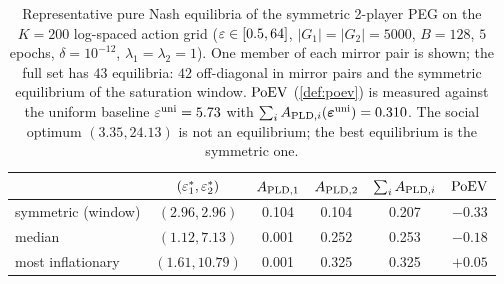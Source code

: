\begin{table}[t]
\centering
\caption{Representative pure Nash equilibria of the symmetric 2-player
PEG on the $K=200$ log-spaced action grid ($\varepsilon \in [0.5, 64]$,
$|G_1|=|G_2|=5000$, $B=128$, $5$ epochs, $\delta=10^{-12}$,
$\lambda_1=\lambda_2=1$). One member of each mirror pair is shown; the
full set has $43$ equilibria: $42$ off-diagonal in mirror pairs and
the symmetric equilibrium of the saturation window. $\mathrm{PoEV}$
(\cref{def:poev}) is measured against the uniform baseline
$\varepsilon^{\mathrm{uni}} = 5.73$ with $\sum_i
A_{\mathrm{PLD},i}(\boldsymbol{\varepsilon}^{\mathrm{uni}}) = 0.310$. The social
optimum $(3.35, 24.13)$ is not an equilibrium; the best equilibrium
is the symmetric one.}
\label{tab:NE}
\small
\setlength{\tabcolsep}{2.8pt}
\begin{tabular}{lccccc}
\toprule
 & $(\varepsilon_1^*, \varepsilon_2^*)$ & $A_{\mathrm{PLD},1}$ & $A_{\mathrm{PLD},2}$ & $\sum_i A_{\mathrm{PLD},i}$ & $\mathrm{PoEV}$ \\
\midrule
symmetric (window) & $(2.96, 2.96)$  & 0.104 & 0.104 & 0.207 & $-0.33$ \\
median             & $(1.12, 7.13)$  & 0.001 & 0.252 & 0.253 & $-0.18$ \\
most inflationary  & $(1.61, 10.79)$ & 0.001 & 0.325 & 0.325 & $+0.05$ \\
\bottomrule
\end{tabular}
\end{table}
